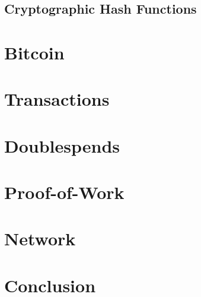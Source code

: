 \documentclass{article}
\begin{document}
\subsection{Cryptographic Hash Functions}

\section{Bitcoin}

\section{Transactions}

\section{Doublespends}

\section{Proof-of-Work}

\section{Network}

\section{Conclusion}
\end{document}
